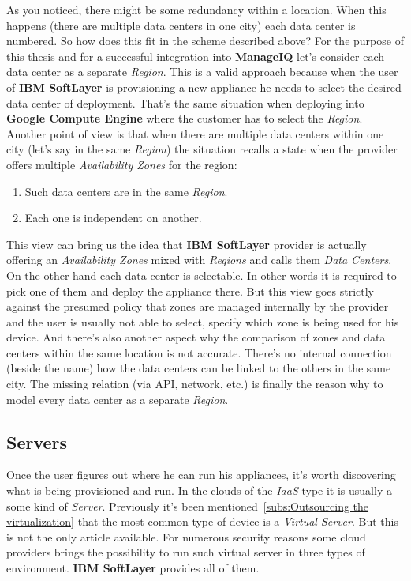 As you noticed, there might be some redundancy within a location. When this happens (there are multiple data centers in one city) each data center is numbered. So how does this fit in the scheme described above? For the purpose of this thesis and for a successful integration into \textbf{ManageIQ} let's consider each data center as a separate \emph{Region}. This is a valid approach because when the user of \textbf{IBM SoftLayer} is provisioning a new appliance he needs to select the desired data center of deployment. That's the same situation when deploying into \textbf{Google Compute Engine} where the customer has to select the \emph{Region}. Another point of view is that when there are multiple data centers within one city (let's say in the same \emph{Region}) the situation recalls a state when the provider offers multiple \emph{Availability Zones} for the region:

\begin{enumerate}
	\item Such data centers are in the same \emph{Region}.
	\item Each one is independent on another.
\end{enumerate}

This view can bring us the idea that \textbf{IBM SoftLayer} provider is actually offering an \emph{Availability Zones} mixed with \emph{Regions} and calls them \emph{Data Centers}. On the other hand each data center is selectable. In other words it is required to pick one of them and deploy the appliance there. But this view goes strictly against the presumed policy that zones are managed internally by the provider and the user is usually not able to select, specify which zone is being used for his device. And there's also another aspect why the comparison of zones and data centers within the same location is not accurate. There's no internal connection (beside the name) how the data centers can be linked to the others in the same city. The missing relation (via API, network, etc.) is finally the reason why to model every data center as a separate \emph{Region}.

\subsection{Servers}
\label{sub:Servers}

Once the user figures out where he can run his appliances, it's worth discovering what is being provisioned and run. In the clouds of the \emph{IaaS} type it is usually a some kind of \emph{Server}. Previously it's been mentioned~\ref{subs:Outsourcing the virtualization} that the most common type of device is a \emph{Virtual Server}. But this is not the only article available. For numerous security reasons some cloud providers brings the possibility to run such virtual server in three types of environment. \textbf{IBM SoftLayer} provides all of them.

